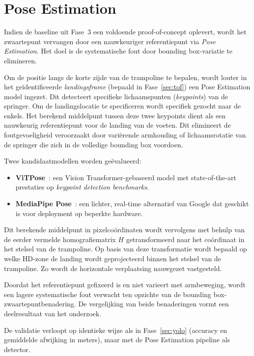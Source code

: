 
\section{Pose Estimation}
\label{sec:pose}

Indien de baseline uit Fase~3 een voldoende proof-of-concept oplevert, wordt het zwaartepunt vervangen door een nauwkeuriger referentiepunt via \textit{Pose Estimation}. Het doel is de systematische fout door bounding box-variatie te elimineren.

Om de positie langs de korte zijde van de trampoline te bepalen, wordt louter in het geïdentificeerde \textit{landingsframe} (bepaald in Fase~\ref{sec:tof}) een Pose Estimation model ingezet. Dit detecteert specifieke lichaamspunten (\textit{keypoints}) van de springer. Om de landingslocatie te specificeren wordt specifiek gezocht naar de enkels. Het berekend middelpunt tussen deze twee keypoints dient als een nauwkeurig referentiepunt voor de landing van de voeten. Dit elimineert de foutgevoeligheid veroorzaakt door vari{\"e}rende armhouding of lichaamsrotatie van de springer die zich in de volledige bounding box voordoen.

Twee kandidaatmodellen worden ge{\"e}valueerd:
\begin{itemize}
    \item \textbf{ViTPose}~\autocite{Xu2022}: een Vision Transformer-gebaseerd model met state-of-the-art prestaties op \textit{keypoint detection benchmarks}.
    \item \textbf{MediaPipe Pose}~\autocite{Lugaresi2019}: een lichter, real-time alternatief van Google dat geschikt is voor deployment op beperkte hardware.
\end{itemize}

Dit berekende middelpunt in pixelco{\"o}rdinaten wordt vervolgens met behulp van de eerder vermelde homografiematrix $H$ getransformeerd naar het co{\"o}rdinaat in het stelsel van de trampoline. Op basis van deze transformatie wordt bepaald op welke HD-zone de landing wordt geprojecteerd binnen het stelsel van de trampoline. Zo wordt de horizontale verplaatsing nauwgezet vastgesteld.

Doordat het referentiepunt gefixeerd is en niet varieert met armbeweging, wordt een lagere systematische fout verwacht ten opzichte van de bounding box-zwaartepuntbenadering. De vergelijking van beide benaderingen vormt een deelresultaat van het onderzoek.

De validatie verloopt op identieke wijze als in Fase~\ref{sec:yolo} (accuracy en gemiddelde afwijking in meters), maar met de Pose Estimation pipeline als detector.
